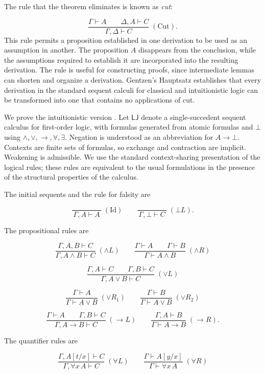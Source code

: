 \documentclass{article}
\begin{document}
The rule that the theorem eliminates is known as \textit{cut}:

\[
\frac{\Gamma\vdash A\qquad\Delta,A\vdash C}
     {\Gamma,\Delta\vdash C}\;(\mathrm{Cut}).
\]
This rule permits a proposition established in one derivation to be used as an assumption in another. The proposition 
$A$ disappears from the conclusion, while the assumptions required to establish it are incorporated into the resulting 
derivation. The rule is useful for constructing proofs, since intermediate lemmas can shorten and organize a derivation. 
Gentzen's Hauptsatz establishes that every derivation in the standard sequent calculi for classical and intuitionistic 
logic can be transformed into one that contains no applications of cut.

We prove the intuitionistic version \textit{\parencite{troelstra2000}}. Let $\mathsf{LJ}$ denote a single-succedent sequent calculus for first-order logic, with formulas generated from atomic formulas and $\bot$ using $\land,\lor,\to,\forall,\exists$. Negation is understood as an abbreviation for $A\to\bot$. Contexts are finite sets of formulas, so exchange and contraction are implicit. Weakening is admissible. We use the standard context-sharing presentation of the logical rules; these rules are equivalent to the usual formulations in the presence of the structural properties of the calculus.

The initial sequents and the rule for falsity are

\[
\frac{}{\,\Gamma,A\vdash A\,}\;(\mathrm{Id})
\qquad
\frac{}{\,\Gamma,\bot\vdash C\,}\;(\bot L).
\]

The propositional rules are

\[
\frac{\Gamma,A,B\vdash C}
     {\Gamma,A\land B\vdash C}\;(\land L)
\qquad
\frac{\Gamma\vdash A\qquad\Gamma\vdash B}
     {\Gamma\vdash A\land B}\;(\land R)
\]

\[
\frac{\Gamma,A\vdash C\qquad\Gamma,B\vdash C}
     {\Gamma,A\lor B\vdash C}\;(\lor L)
\]

\[
\frac{\Gamma\vdash A}
     {\Gamma\vdash A\lor B}\;(\lor R_1)
\qquad
\frac{\Gamma\vdash B}
     {\Gamma\vdash A\lor B}\;(\lor R_2)
\]

\[
\frac{\Gamma\vdash A\qquad\Gamma,B\vdash C}
     {\Gamma,A\to B\vdash C}\;(\to L)
\qquad
\frac{\Gamma,A\vdash B}
     {\Gamma\vdash A\to B}\;(\to R).
\]

The quantifier rules are

\[
\frac{\Gamma,A[t/x]\vdash C}
     {\Gamma,\forall x\,A\vdash C}\;(\forall L)
\qquad
\frac{\Gamma\vdash A[y/x]}
     {\Gamma\vdash\forall x\,A}\;(\forall R)
\]
\end{document}
